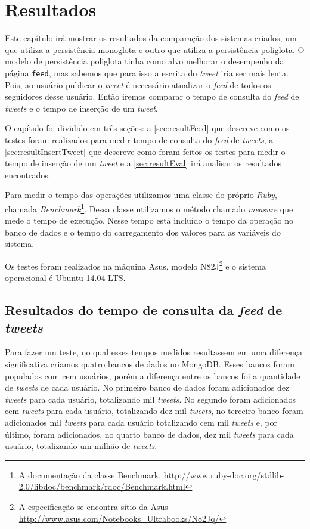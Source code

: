 \chapter{Resultados}
\label{chap:resultados}
Este capítulo irá mostrar os resultados da comparação dos sistemas criados, um que utiliza a persistência monoglota e outro que utiliza a persistência poliglota. O modelo de persistência poliglota tinha como alvo melhorar o desempenho da página \verb|feed|, mas sabemos que para isso a escrita do \textit{tweet} iria ser mais lenta. Pois, ao usuário publicar o \textit{tweet} é necessário atualizar o \textit{feed} de todos os seguidores desse usuário. Então iremos comparar o tempo de consulta do \textit{feed} de \textit{tweets} e o tempo de inserção de um \textit{tweet}.

O capítulo foi dividido em três seções: a \autoref{sec:resultFeed} que descreve como os testes foram realizados para medir tempo de consulta do \textit{feed} de \textit{tweets}, a \autoref{sec:resultInsertTweet} que descreve como foram feitos os testes para medir o tempo de inserção de um \textit{tweet} e a \autoref{sec:resultEval} irá analisar os resultados encontrados.

Para medir o tempo das operações utilizamos uma classe do próprio \textit{Ruby}, chamada \textit{Benchmark}\footnote{A documentação da classe Benchmark. \url{http://www.ruby-doc.org/stdlib-2.0/libdoc/benchmark/rdoc/Benchmark.html}}. Dessa classe utilizamos o método chamado \textit{measure} que mede o tempo de execução. Nesse tempo está incluído o tempo da operação no banco de dados e o tempo do carregamento dos valores para as variáveis do sistema.

Os testes foram realizados na máquina Asus, modelo N82J\footnote{A especificação se encontra sítio da Asus \url{http://www.asus.com/Notebooks_Ultrabooks/N82Jq/}} e o sistema operacional é Ubuntu 14.04 LTS.


\section{Resultados do tempo de consulta da \textit{feed} de \textit{tweets}}
\label{sec:resultFeed}

Para fazer um teste, no qual esses tempos medidos resultassem em uma diferença significativa criamos quatro bancos de dados no MongoDB. Esses bancos foram populados com cem usuários, porém a diferença entre os bancos foi a quantidade de \textit{tweets} de cada usuário. No primeiro banco de dados foram adicionados dez \textit{tweets} para cada usuário, totalizando mil \textit{tweets}. No segundo foram adicionados cem \textit{tweets} para cada usuário, totalizando dez mil \textit{tweets}, no terceiro banco foram adicionados mil \textit{tweets} para cada usuário totalizando cem mil \textit{tweets} e, por último, foram adicionados, no quarto banco de dados, dez mil \textit{tweets} para cada usuário, totalizando um milhão de \textit{tweets}.

